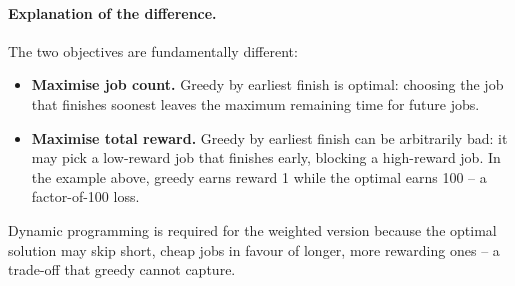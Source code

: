 \documentclass[11pt,a4paper]{article}
\begin{document}
\paragraph{Explanation of the difference.}
The two objectives are fundamentally different:
\begin{itemize}[noitemsep]
  \item \textbf{Maximise job count.} Greedy by earliest finish is optimal: choosing the job that finishes soonest leaves the maximum remaining time for future jobs.
  \item \textbf{Maximise total reward.} Greedy by earliest finish can be arbitrarily bad: it may pick a low-reward job that finishes early, blocking a high-reward job. In the example above, greedy earns reward 1 while the optimal earns 100 -- a factor-of-100 loss.
\end{itemize}

Dynamic programming is required for the weighted version because the optimal solution may skip short, cheap jobs in favour of longer, more rewarding ones -- a trade-off that greedy cannot capture.
\end{document}
